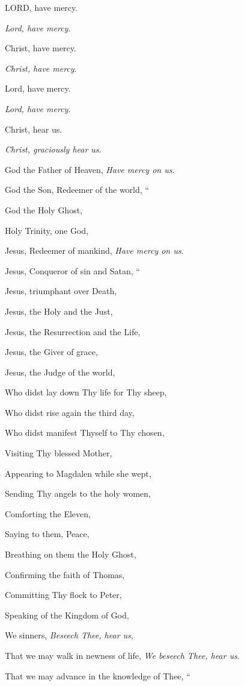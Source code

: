 
LORD, have mercy.

\emph{Lord, have mercy}.

Christ, have mercy.

\emph{Christ, have mercy}.

Lord, have mercy.

\emph{Lord, have mercy}.

Christ, hear us.

\emph{Christ, graciously hear us}.

God the Father of Heaven,
\emph{Have mercy on us}.

God the Son, Redeemer of the world,
``

God the Holy Ghost,

Holy Trinity, one God,

Jesus, Redeemer of mankind,
\emph{Have mercy on us}.

Jesus, Conqueror of sin and Satan,
``

Jesus, triumphant over Death,

Jesus, the Holy and the Just,

Jesus, the Resurrection and the Life,

Jesus, the Giver of grace,

Jesus, the Judge of the world, 

Who didst lay down Thy life for Thy sheep,

Who didst rise again the third day,

Who didst manifest Thyself to Thy chosen,

Visiting Thy blessed Mother,

Appearing to Magdalen while she wept,

Sending Thy angels to the holy women,

Comforting the Eleven,

Saying to them, Peace,

Breathing on them the Holy Ghost,

Confirming the faith of Thomas,

Committing Thy flock to Peter,

Speaking of the Kingdom of God,

We sinners, \emph{Beseech Thee,
hear us},

That we may walk in newness of life,
\emph{We beseech Thee, hear us}.

That we may advance in the knowledge of Thee,
``

